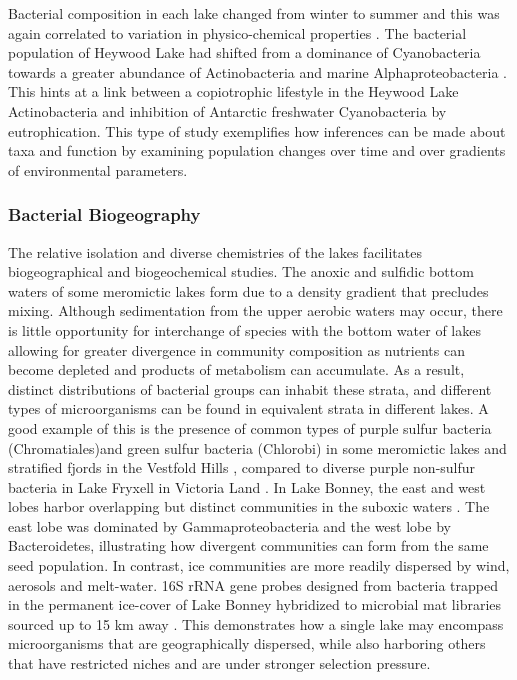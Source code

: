 Bacterial composition in each lake changed from winter to summer and this was again correlated to variation in physico-chemical properties \cite{Pearce2005}. 
The bacterial population of Heywood Lake had shifted from a dominance of Cyanobacteria towards a greater abundance of Actinobacteria and marine Alphaproteobacteria \cite{Pearce2005}.
This hints at a link between a copiotrophic lifestyle in the Heywood Lake Actinobacteria and inhibition of Antarctic freshwater Cyanobacteria by eutrophication. 
This type of study exemplifies how inferences can be made about taxa and function by examining population changes over time and over gradients of environmental parameters.

\subsubsection{Bacterial Biogeography}
The relative isolation and diverse chemistries of the lakes facilitates biogeographical and biogeochemical studies. 
The anoxic and sulfidic bottom waters of some meromictic lakes form due to a density gradient that precludes mixing. 
Although sedimentation from the upper aerobic waters may occur, 
there is little opportunity for interchange of species with the bottom water of lakes allowing for greater divergence in community composition as nutrients can become depleted 
and products of metabolism can accumulate.
As a result, distinct distributions of bacterial groups can inhabit these strata, and different types of microorganisms can be found in equivalent strata in different lakes. 
A good example of this is the presence of common types of purple sulfur bacteria (Chromatiales)and green sulfur bacteria (Chlorobi) 
in some meromictic lakes and stratified fjords in the Vestfold Hills \cite{Burke1988},
compared to diverse purple non-sulfur bacteria in Lake Fryxell in Victoria Land \cite{Karr2003}. 
In Lake Bonney, the east and west lobes harbor overlapping but distinct communities in the suboxic waters \cite{Glatz2006}.
The east lobe was dominated by Gammaproteobacteria and the west lobe by Bacteroidetes, illustrating how divergent communities can form from the same seed population. 
In contrast, ice communities are more readily dispersed by wind, aerosols and melt-water. 
16S rRNA gene probes designed from bacteria trapped in the permanent ice-cover of Lake Bonney hybridized to microbial mat libraries sourced up to 15 km away \cite{Gordon2000}.
This demonstrates how a single lake may encompass microorganisms that are geographically dispersed, while also harboring others that have restricted niches and are under stronger selection pressure.


